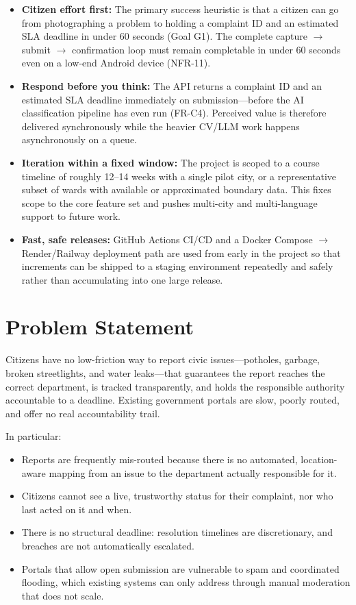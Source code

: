 \documentclass[12pt,a4paper]{article}
\begin{document}
\begin{itemize}
    \item \textbf{Citizen effort first:} The primary success heuristic is that a citizen can go from photographing a problem to holding a complaint ID and an estimated SLA deadline in under 60 seconds (Goal G1). The complete capture $\rightarrow$ submit $\rightarrow$ confirmation loop must remain completable in under 60 seconds even on a low-end Android device (NFR-11).

    \item \textbf{Respond before you think:} The API returns a complaint ID and an estimated SLA deadline immediately on submission---before the AI classification pipeline has even run (FR-C4). Perceived value is therefore delivered synchronously while the heavier CV/LLM work happens asynchronously on a queue.

    \item \textbf{Iteration within a fixed window:} The project is scoped to a course timeline of roughly 12--14 weeks with a single pilot city, or a representative subset of wards with available or approximated boundary data. This fixes scope to the core feature set and pushes multi-city and multi-language support to future work.

    \item \textbf{Fast, safe releases:} GitHub Actions CI/CD and a Docker Compose $\rightarrow$ Render/Railway deployment path are used from early in the project so that increments can be shipped to a staging environment repeatedly and safely rather than accumulating into one large release.
\end{itemize}

\section{Problem Statement}

Citizens have no low-friction way to report civic issues---potholes, garbage, broken streetlights, and water leaks---that guarantees the report reaches the correct department, is tracked transparently, and holds the responsible authority accountable to a deadline. Existing government portals are slow, poorly routed, and offer no real accountability trail.

In particular:
\begin{itemize}
    \item Reports are frequently mis-routed because there is no automated, location-aware mapping from an issue to the department actually responsible for it.
    \item Citizens cannot see a live, trustworthy status for their complaint, nor who last acted on it and when.
    \item There is no structural deadline: resolution timelines are discretionary, and breaches are not automatically escalated.
    \item Portals that allow open submission are vulnerable to spam and coordinated flooding, which existing systems can only address through manual moderation that does not scale.
\end{itemize}
\end{document}
